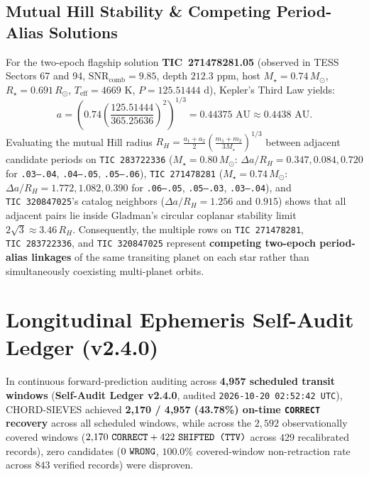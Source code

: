 \documentclass[10pt,twocolumn]{article}
\begin{document}
\subsection{Mutual Hill Stability \& Competing Period-Alias Solutions}
For the two-epoch flagship solution \textbf{TIC~271478281.05} (observed in TESS Sectors 67 and 94, $\text{SNR}_{\text{comb}} = 9.85$, depth $212.3\text{ ppm}$, host $M_\star = 0.74\,M_\odot$, $R_\star = 0.691\,R_\odot$, $T_{\text{eff}} = 4669\text{ K}$, $P = 125.51444\text{ d}$), Kepler's Third Law yields:
\begin{equation}
  a = \left( 0.74 \left(\frac{125.51444}{365.25636}\right)^2 \right)^{1/3} = 0.44375\text{ AU} \approx 0.4438\text{ AU}.
\end{equation}
Evaluating the mutual Hill radius $R_H = \frac{a_1 + a_2}{2}\left(\frac{m_1 + m_2}{3 M_\star}\right)^{1/3}$ between adjacent candidate periods on \texttt{TIC~283722336} ($M_\star = 0.80\,M_\odot$: $\Delta a / R_H = 0.347, 0.084, 0.720$ for \texttt{.03--.04}, \texttt{.04--.05}, \texttt{.05--.06}), \texttt{TIC~271478281} ($M_\star = 0.74\,M_\odot$: $\Delta a / R_H = 1.772, 1.082, 0.390$ for \texttt{.06--.05}, \texttt{.05--.03}, \texttt{.03--.04}), and \texttt{TIC~320847025}'s catalog neighbors ($\Delta a / R_H = 1.256$ and $0.915$) shows that all adjacent pairs lie inside Gladman's circular coplanar stability limit $2\sqrt{3} \approx 3.46\,R_H$. Consequently, the multiple rows on \texttt{TIC~271478281}, \texttt{TIC~283722336}, and \texttt{TIC~320847025} represent \textbf{competing two-epoch period-alias linkages} of the same transiting planet on each star rather than simultaneously coexisting multi-planet orbits.

\section{Longitudinal Ephemeris Self-Audit Ledger (v2.4.0)}
In continuous forward-prediction auditing across \textbf{4,957 scheduled transit windows} (\textbf{Self-Audit Ledger v2.4.0}, audited \texttt{2026-10-20 02:52:42 UTC}), CHORD-SIEVES achieved \textbf{2,170 / 4,957 (43.78\%) on-time \texttt{CORRECT} recovery} across all scheduled windows, while across the $2{,}592$ observationally covered windows ($2{,}170\text{ \texttt{CORRECT}} + 422\text{ \texttt{SHIFTED (TTV)}}$ across $429$ recalibrated records), zero candidates ($0\text{ \texttt{WRONG}}$, $100.0\%$ covered-window non-retraction rate across $843$ verified records) were disproven.
\end{document}
